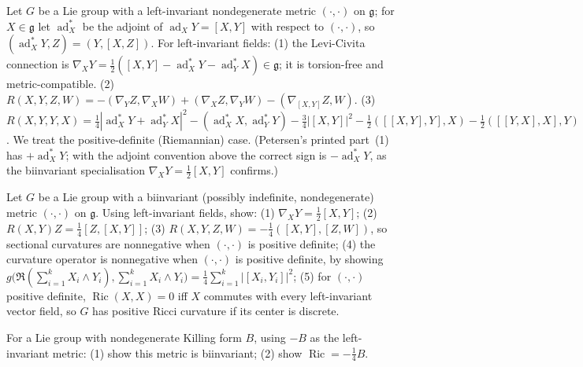 \begin{remark}[Exercise 3.4.31]
  \label{rem:pet-ch3-ex-31}
  \leanok
  Let $G$ be a Lie group with a left-invariant nondegenerate metric
  $(\cdot,\cdot)$ on $\mathfrak g$; for $X\in\mathfrak g$ let
  $\operatorname{ad}_X^*$ be the adjoint of $\operatorname{ad}_XY=[X,Y]$ with
  respect to $(\cdot,\cdot)$, so $(\operatorname{ad}_X^*Y,Z)=(Y,[X,Z])$. For
  left-invariant fields:
  (1) the Levi-Civita connection is
  $\nabla_XY=\tfrac12([X,Y]-\operatorname{ad}_X^*Y-\operatorname{ad}_Y^*X)\in\mathfrak g$;
  it is torsion-free and metric-compatible.
  (2) $R(X,Y,Z,W)=-(\nabla_YZ,\nabla_XW)+(\nabla_XZ,\nabla_YW)-(\nabla_{[X,Y]}Z,W)$.
  (3)
  $R(X,Y,Y,X)=\tfrac14|\operatorname{ad}_X^*Y+\operatorname{ad}_Y^*X|^2-(\operatorname{ad}_X^*X,\operatorname{ad}_Y^*Y)-\tfrac34|[X,Y]|^2-\tfrac12([[X,Y],Y],X)-\tfrac12([[Y,X],X],Y)$.
  We treat the positive-definite (Riemannian) case. (Petersen's printed part~(1)
  has $+\operatorname{ad}_X^*Y$; with the adjoint convention above the correct
  sign is $-\operatorname{ad}_X^*Y$, as the biinvariant specialisation
  $\nabla_XY=\tfrac12[X,Y]$ confirms.)
\end{remark}

\begin{remark}[Exercise 3.4.32]
  \label{rem:pet-ch3-ex-32}
  \leanok
  Let $G$ be a Lie group with a biinvariant (possibly indefinite, nondegenerate)
  metric $(\cdot,\cdot)$ on $\mathfrak g$. Using left-invariant fields, show: (1)
  $\nabla_XY=\tfrac12[X,Y]$; (2) $R(X,Y)Z=\tfrac14[Z,[X,Y]]$; (3)
  $R(X,Y,Z,W)=-\tfrac14([X,Y],[Z,W])$, so sectional curvatures are nonnegative
  when $(\cdot,\cdot)$ is positive definite; (4) the curvature operator is
  nonnegative when $(\cdot,\cdot)$ is positive definite, by showing
  $g\big(\mathfrak R(\sum_{i=1}^kX_i\wedge Y_i),\sum_{i=1}^kX_i\wedge
  Y_i\big)=\tfrac14\sum_{i=1}^k|[X_i,Y_i]|^2$; (5) for $(\cdot,\cdot)$ positive
  definite, $\operatorname{Ric}(X,X)=0$ iff $X$ commutes with every left-invariant
  vector field, so $G$ has positive Ricci curvature if its center is discrete.
\end{remark}

\begin{remark}[Exercise 3.4.33]
  \label{rem:pet-ch3-ex-33}
  \leanok
  For a Lie group with nondegenerate Killing form $B$, using $-B$ as the
  left-invariant metric: (1) show this metric is biinvariant; (2) show
  $\operatorname{Ric}=-\tfrac14B$.
\end{remark}

